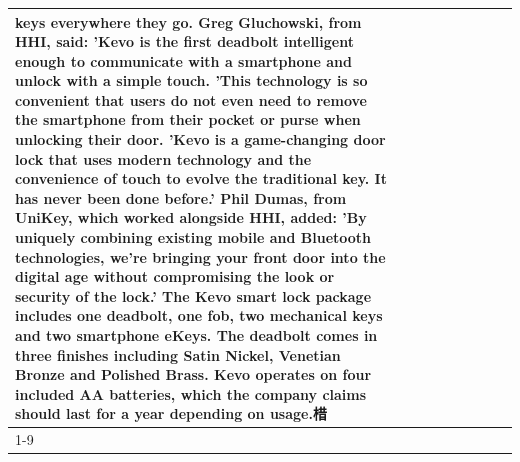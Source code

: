 \begin{table}[H]
\begin{tabular}{lllrlllll}
keys everywhere they go. Greg Gluchowski, from HHI, said: 'Kevo is the first deadbolt intelligent enough to communicate with a smartphone and unlock with a simple touch. 'This technology is so convenient that users do not even need to remove the smartphone from their pocket or purse when unlocking their door. 'Kevo is a game-changing door lock that uses modern technology and the convenience of touch to evolve the traditional key. It has never been done before.' Phil Dumas, from UniKey, which worked alongside HHI, added: 'By uniquely combining existing mobile and Bluetooth technologies, we’re bringing your front door into the digital age without compromising the look or security of the lock.' The Kevo smart lock package includes one deadbolt, one fob, two mechanical keys and two smartphone eKeys. The deadbolt comes in three finishes including Satin Nickel, Venetian Bronze and Polished Brass. Kevo operates on four included AA batteries, which the company claims should last for a year depending on usage.棤 \\
\cline{1-9}

\end{tabular}
\end{table}
